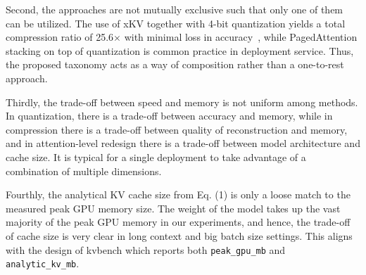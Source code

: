 \documentclass[conference]{IEEEtran}
\begin{document}
Second, the approaches are not mutually exclusive such that only one of them can be utilized. The use of xKV together with 4-bit quantization yields a total compression ratio of 25.6$\times$ with minimal loss in accuracy~\cite{chang2025xkv}, while PagedAttention stacking on top of quantization is common practice in deployment service. Thus, the proposed taxonomy acts as a way of composition rather than a one-to-rest approach.

Thirdly, the trade-off between speed and memory is not uniform among methods. In quantization, there is a trade-off between accuracy and memory, while in compression there is a trade-off between quality of reconstruction and memory, and in attention-level redesign there is a trade-off between model architecture and cache size. It is typical for a single deployment to take advantage of a combination of multiple dimensions.

Fourthly, the analytical KV cache size from Eq. (1) is only a loose match to the measured peak GPU memory size. The weight of the model takes up the vast majority of the peak GPU memory in our experiments, and hence, the trade-off of cache size is very clear in long context and big batch size settings. This aligns with the design of kvbench which reports both \texttt{peak\_gpu\_mb} and \texttt{analytic\_kv\_mb}.
\end{document}

